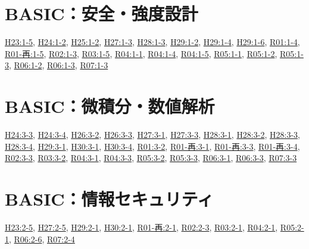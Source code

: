 \section{BASIC：安全・強度設計}
\hyperref[q:h23-reg-basic-1-5]{H23:1-5}, \hyperref[q:h24-reg-basic-1-2]{H24:1-2}, \hyperref[q:h25-reg-basic-1-2]{H25:1-2}, \hyperref[q:h27-reg-basic-1-3]{H27:1-3}, \hyperref[q:h28-reg-basic-1-3]{H28:1-3}, \hyperref[q:h29-reg-basic-1-2]{H29:1-2}, \hyperref[q:h29-reg-basic-1-4]{H29:1-4}, \hyperref[q:h29-reg-basic-1-6]{H29:1-6}, \hyperref[q:r01-reg-basic-1-4]{R01:1-4}, \hyperref[q:r01-ret-basic-1-5]{R01-再:1-5}, \hyperref[q:r02-reg-basic-1-3]{R02:1-3}, \hyperref[q:r03-reg-basic-1-5]{R03:1-5}, \hyperref[q:r04-reg-basic-1-1]{R04:1-1}, \hyperref[q:r04-reg-basic-1-4]{R04:1-4}, \hyperref[q:r04-reg-basic-1-5]{R04:1-5}, \hyperref[q:r05-reg-basic-1-1]{R05:1-1}, \hyperref[q:r05-reg-basic-1-2]{R05:1-2}, \hyperref[q:r05-reg-basic-1-3]{R05:1-3}, \hyperref[q:r06-reg-basic-1-2]{R06:1-2}, \hyperref[q:r06-reg-basic-1-3]{R06:1-3}, \hyperref[q:r07-reg-basic-1-3]{R07:1-3}
\section{BASIC：微積分・数値解析}
\hyperref[q:h24-reg-basic-3-3]{H24:3-3}, \hyperref[q:h24-reg-basic-3-4]{H24:3-4}, \hyperref[q:h26-reg-basic-3-2]{H26:3-2}, \hyperref[q:h26-reg-basic-3-3]{H26:3-3}, \hyperref[q:h27-reg-basic-3-1]{H27:3-1}, \hyperref[q:h27-reg-basic-3-3]{H27:3-3}, \hyperref[q:h28-reg-basic-3-1]{H28:3-1}, \hyperref[q:h28-reg-basic-3-2]{H28:3-2}, \hyperref[q:h28-reg-basic-3-3]{H28:3-3}, \hyperref[q:h28-reg-basic-3-4]{H28:3-4}, \hyperref[q:h29-reg-basic-3-1]{H29:3-1}, \hyperref[q:h30-reg-basic-3-1]{H30:3-1}, \hyperref[q:h30-reg-basic-3-4]{H30:3-4}, \hyperref[q:r01-reg-basic-3-2]{R01:3-2}, \hyperref[q:r01-ret-basic-3-1]{R01-再:3-1}, \hyperref[q:r01-ret-basic-3-3]{R01-再:3-3}, \hyperref[q:r01-ret-basic-3-4]{R01-再:3-4}, \hyperref[q:r02-reg-basic-3-3]{R02:3-3}, \hyperref[q:r03-reg-basic-3-2]{R03:3-2}, \hyperref[q:r04-reg-basic-3-1]{R04:3-1}, \hyperref[q:r04-reg-basic-3-3]{R04:3-3}, \hyperref[q:r05-reg-basic-3-2]{R05:3-2}, \hyperref[q:r05-reg-basic-3-3]{R05:3-3}, \hyperref[q:r06-reg-basic-3-1]{R06:3-1}, \hyperref[q:r06-reg-basic-3-3]{R06:3-3}, \hyperref[q:r07-reg-basic-3-3]{R07:3-3}
\section{BASIC：情報セキュリティ}
\hyperref[q:h23-reg-basic-2-5]{H23:2-5}, \hyperref[q:h27-reg-basic-2-5]{H27:2-5}, \hyperref[q:h29-reg-basic-2-1]{H29:2-1}, \hyperref[q:h30-reg-basic-2-1]{H30:2-1}, \hyperref[q:r01-ret-basic-2-1]{R01-再:2-1}, \hyperref[q:r02-reg-basic-2-3]{R02:2-3}, \hyperref[q:r03-reg-basic-2-1]{R03:2-1}, \hyperref[q:r04-reg-basic-2-1]{R04:2-1}, \hyperref[q:r05-reg-basic-2-1]{R05:2-1}, \hyperref[q:r06-reg-basic-2-6]{R06:2-6}, \hyperref[q:r07-reg-basic-2-4]{R07:2-4}
